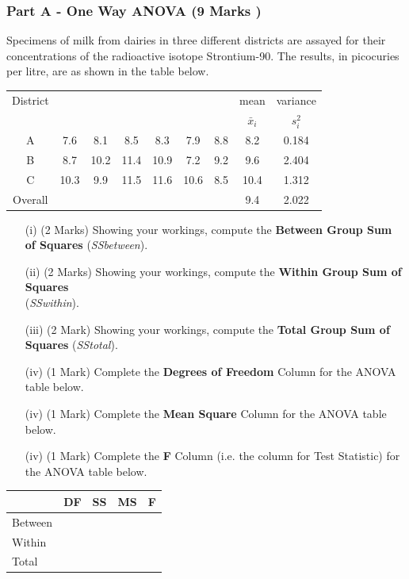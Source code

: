 \documentclass[a4paper,12pt]{article}
\begin{document}
\newpage


\subsubsection*{Part A - One Way ANOVA (9 Marks )}
Specimens of milk from dairies in three different districts are assayed for their concentrations of the radioactive isotope Strontium-90. 
The results, in picocuries per litre, are as shown in the table below.

{
	\Large
	\begin{center}
		\begin{tabular}{|c|cccccc|c|c|}
			\hline  
			District & &&&&& & mean & variance \\  
			&  &&&&&& $\bar{x}_i$ & $s^2_{i}$ \\  
			\hline \hline
			A	&	7.6	&	8.1	&	8.5	&	8.3	&	7.9	&	8.8
			&	8.2	&	0.184	\\ \hline
			B	&	8.7	&	10.2	&	11.4	&	10.9	&	7.2	&	9.2
			&	9.6	&	2.404	\\ \hline
			C	&	10.3	&	9.9	&	11.5	&	11.6	&	10.6	&	8.5
			&	10.4	&	1.312	\\ \hline \hline
			Overall & &&&&&&	9.4	&	2.022 \\ \hline	
			
		\end{tabular} 
	\end{center}
}
\bigskip
\begin{itemize}
	\item[(i)] (2 Marks) Showing your workings, compute the \textbf{Between Group Sum of Squares} (\textit{SSbetween}).
	\item[(ii)] (2 Marks) Showing your workings, compute the \textbf{Within Group Sum of Squares}\\ (\textit{SSwithin}).
	\item[(iii)] (2 Mark) Showing your workings, compute the \textbf{Total Group Sum of Squares} (\textit{SStotal}).
	\item[(iv)] (1 Mark) Complete the \textbf{Degrees of Freedom} Column for the ANOVA table below.
	\item[(iv)] (1 Mark) Complete the \textbf{Mean Square} Column for the ANOVA table below.
	\item[(iv)] (1 Mark) Complete the \textbf{F} Column (i.e. the column for Test Statistic) for the ANOVA table below.
\end{itemize}
\bigskip
{
	\Large
	\begin{center}
		\begin{tabular}{|l||c|c|c|c|}
			\hline \phantom{makespace} & DF & SS & MS & F \\ \hline
			\hline Between & \phantom{makespa} &  &  &  \\ 
			\hline Within &  &\phantom{makespace}  &  &  \\ \hline
			\hline Total &  \phantom{makespace} &  &\phantom{makespace}  & \phantom{makespace} \\ 
			\hline 
		\end{tabular} 
	\end{center}
}
\end{document}
